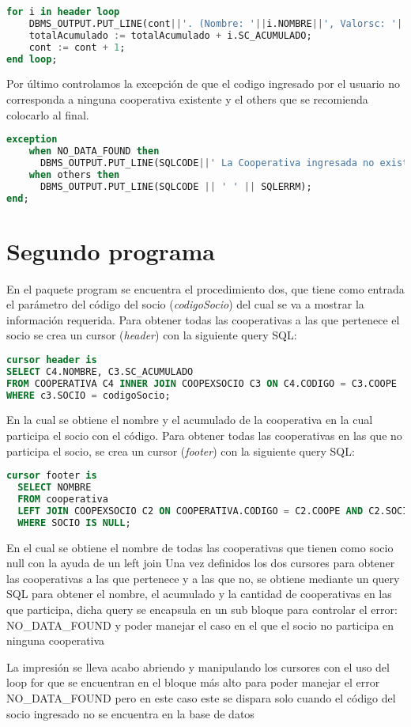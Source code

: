 \documentclass{article}
\begin{document}
\begin{lstlisting}[language=SQL]
for i in header loop
    DBMS_OUTPUT.PUT_LINE(cont||'. (Nombre: '||i.NOMBRE||', Valorsc: '||i.SC_ACUMULADO||')');
    totalAcumulado := totalAcumulado + i.SC_ACUMULADO;
    cont := cont + 1;
end loop;
\end{lstlisting}
Por último controlamos la excepción de que el codigo ingresado por el usuario no corresponda a ninguna cooperativa existente y el others que se recomienda colocarlo al final.
\begin{lstlisting}[language=SQL]
exception
    when NO_DATA_FOUND then
      DBMS_OUTPUT.PUT_LINE(SQLCODE||' La Cooperativa ingresada no existe');
    when others then
      DBMS_OUTPUT.PUT_LINE(SQLCODE || ' ' || SQLERRM);
end;
\end{lstlisting}
\section{Segundo programa}
En el paquete program se encuentra el procedimiento dos, que tiene como entrada el parámetro del código del socio (\emph{codigoSocio}) del cual se va a mostrar la información requerida.
Para obtener todas las cooperativas a las que pertenece el socio se crea un cursor (\emph{header}) con la siguiente query SQL: 

\begin{lstlisting}[language=SQL]
cursor header is
SELECT C4.NOMBRE, C3.SC_ACUMULADO
FROM COOPERATIVA C4 INNER JOIN COOPEXSOCIO C3 ON C4.CODIGO = C3.COOPE
WHERE c3.SOCIO = codigoSocio;
\end{lstlisting}
En la cual se obtiene el nombre y el acumulado de la cooperativa en la cual participa el socio con el código.
Para obtener todas las cooperativas en las que no participa el socio, se crea un cursor (\emph{footer}) con la siguiente query SQL: 
\begin{lstlisting}[language=SQL]
cursor footer is
  SELECT NOMBRE
  FROM cooperativa
  LEFT JOIN COOPEXSOCIO C2 ON COOPERATIVA.CODIGO = C2.COOPE AND C2.SOCIO = codigoSocio
  WHERE SOCIO IS NULL;
\end{lstlisting}
En el cual se obtiene el nombre de todas las cooperativas que tienen como socio null con la ayuda de un left join
Una vez definidos los dos cursores para obtener las cooperativas a las que pertenece y a las que no, se obtiene mediante un query SQL para obtener el nombre, el acumulado y la cantidad de cooperativas en las que participa, dicha query se encapsula en un sub bloque para controlar el error: NO\_DATA\_FOUND y poder manejar el caso en el que el socio no participa en ninguna cooperativa

La impresión se lleva acabo abriendo y manipulando los cursores con el uso del loop for que se encuentran en el bloque más alto para poder manejar el error NO\_DATA\_FOUND pero en este caso este se dispara solo cuando el código del socio ingresado no se encuentra en la base de datos
\end{document}
